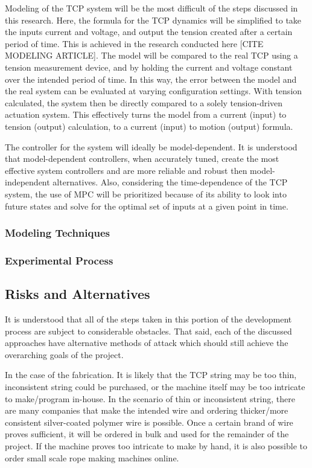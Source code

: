 Modeling of the TCP system will be the most difficult of the steps discussed in this research. Here, the formula for the TCP dynamics will be simplified to take the inputs current and voltage, and output the tension created after a certain period of time. This is achieved in the research conducted here [CITE MODELING ARTICLE]. The model will be compared to the real TCP using a tension measurement device, and by holding the current and voltage constant over the intended period of time. In this way, the error between the model and the real system can be evaluated at varying configuration settings. With tension calculated, the system then be directly compared to a solely tension-driven actuation system. This effectively turns the model from a current (input) to tension (output) calculation, to a current (input) to motion (output) formula.

The controller for the system will ideally be model-dependent. It is understood that model-dependent controllers, when accurately tuned, create the most effective system controllers and are more reliable and robust then model-independent alternatives. Also, considering the time-dependence of the TCP system, the use of MPC will be prioritized because of its ability to look into future states and solve for the optimal set of inputs at a given point in time.

	\subsubsection{Modeling Techniques}
	
	
	\subsubsection{Experimental Process}

\subsection{Risks and Alternatives}

It is understood that all of the steps taken in this portion of the development process are subject to considerable obstacles. That said, each of the discussed approaches have alternative methods of attack which should still achieve the overarching goals of the project.

In the case of the fabrication. It is likely that the TCP string may be too thin, inconsistent string could be purchased, or the machine itself may be too intricate to make/program in-house. In the scenario of thin or inconsistent string, there are many companies that make the intended wire and ordering thicker/more consistent silver-coated polymer wire is possible. Once a certain brand of wire proves sufficient, it will be ordered in bulk and used for the remainder of the project. If the machine proves too intricate to make by hand, it is also possible to order small scale rope making machines online.

